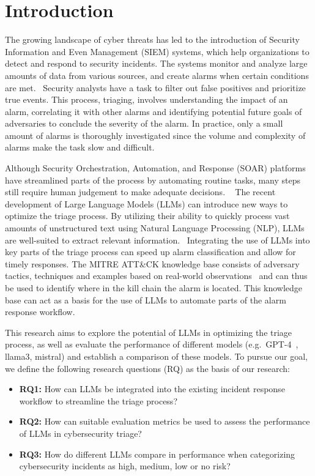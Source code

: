 \section{Introduction}
\label{sec:introduction}

The growing landscape of cyber threats has led to the introduction of Security Information and Even Management (SIEM)
systems, which help organizations to detect and respond to security incidents.
The systems monitor and analyze large amounts of data from various sources, and create alarms when certain conditions
are met.\ \citep{ibmsiem}
Security analysts have a task to filter out false positives and prioritize true events.
This process, triaging, involves understanding the impact of an alarm, correlating it with other alarms and identifying
potential future goals of adversaries to conclude the severity of the alarm.
In practice, only a small amount of alarms is thoroughly investigated since the volume and complexity of alarms make
the task slow and difficult.\ \citep{chen2024elevating}

Although Security Orchestration, Automation, and Response (SOAR) platforms have streamlined parts of the process by
automating routine tasks, many steps still require human judgement to make adequate decisions.
\ \citep{chuvakin2019triaging}
The recent development of Large Language Models (LLMs) can introduce new ways to optimize the triage process.
By utilizing their ability to quickly process vast amounts of unstructured text using Natural Language Processing (NLP),
LLMs are well-suited to extract relevant information.\ \citep{chaudhary2024ai}
Integrating the use of LLMs into key parts of the triage process can speed up alarm classification and allow for timely
responses.
The MITRE ATT\&CK knowledge base consists of adversary tactics, techniques and examples based on real-world
observations\ \citep{strom2018mitre} and can thus be used to identify where in the kill chain the alarm is located.
This knowledge base can act as a basis for the use of LLMs to automate parts of the alarm response workflow.

This research aims to explore the potential of LLMs in optimizing the triage process, as well as evaluate the
performance of different models (e.g.\ GPT-4\ \citep{achiam2023gpt}, llama3, mistral) and establish a comparison of
these models.
To pursue our goal, we define the following research questions (RQ) as the basis of our research:

\begin{itemize}
    \item \textbf{RQ1:} How can LLMs be integrated into the existing incident response workflow to streamline the triage process?
    \item \textbf{RQ2:} How can suitable evaluation metrics be used to assess the performance of LLMs in cybersecurity triage?
    \item \textbf{RQ3:} How do different LLMs compare in performance when categorizing cybersecurity incidents as high, medium, low or no risk?
\end{itemize}

